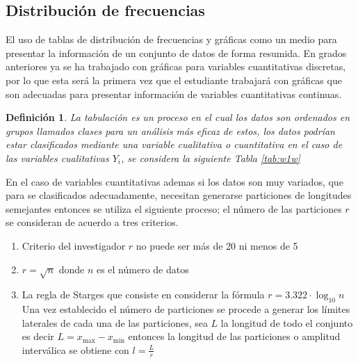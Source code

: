 \documentclass[a4paper]{report}
\newtheorem{defn}[thm]{Definición}
\begin{document}
\begin{t}
\subsection{Distribución de frecuencias}
El uso de tablas de distribución de frecuencias y gráficas como un medio para presentar la información
de un conjunto de datos de forma resumida. En grados anteriores ya se ha trabajado con gráficas para
variables cuantitativas discretas, por lo que esta será la primera vez que el estudiante trabajará con
gráficas que son adecuadas para presentar información de variables cuantitativas continuas.

\begin{defn}
	La tabulación es un proceso en el cual los datos son ordenados en grupos llamados clases para un análisis más eficaz de estos, los datos podrían estar clasificados mediante una variable cualitativa o cuantitativa en el caso de las variables cualitativas $Y_i$, se considera la siguiente Tabla \ref{tab:w1w}
\end{defn}


En el caso de variables cuantitativas ademas si los datos son muy variados, que para se clasificados adecuadamente, necesitan generarse particiones de longitudes semejantes entonces se utiliza el siguiente proceso; el número de las particiones $r$ se consideran de acuerdo a tres criterios.
\begin{enumerate}
	\item Criterio del investigador $r$ no puede ser más de 20 ni menos de 5
	\item $r=\sqrt{n}$ donde $n$ es el número de datos
	\item La regla de Starges que consiste en considerar la fórmula $r=3.322\cdot\log_{10} n$ Una vez establecido el número de particiones se procede a generar los límites laterales de cada una de las particiones, sea $L$ la longitud de todo el conjunto es decir $L=x_{\text{max}}-x_{\text{min}}$ entonces la longitud de las particiones o amplitud interválica se obtiene con $l=\frac{L}{r}$
\end{enumerate}




\end{t}
\end{document}
